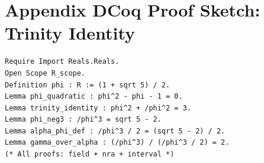 \documentclass[12pt,a4paper]{article}
\begin{document}
\section*{Appendix D\quad Coq Proof Sketch: Trinity Identity}
\begin{verbatim}
Require Import Reals.Reals.
Open Scope R_scope.
Definition phi : R := (1 + sqrt 5) / 2.
Lemma phi_quadratic : phi^2 - phi - 1 = 0.
Lemma trinity_identity : phi^2 + /phi^2 = 3.
Lemma phi_neg3 : /phi^3 = sqrt 5 - 2.
Lemma alpha_phi_def : /phi^3 / 2 = (sqrt 5 - 2) / 2.
Lemma gamma_over_alpha : (/phi^3) / (/phi^3 / 2) = 2.
(* All proofs: field + nra + interval *)
\end{verbatim}
\end{document}
